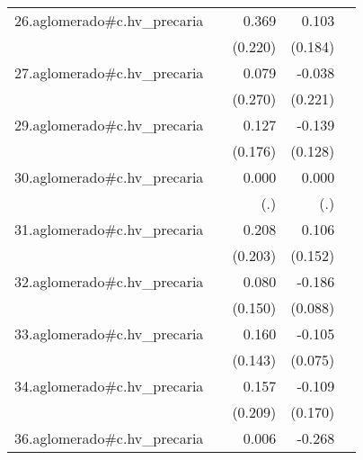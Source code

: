 {\begin{longtable}{l*{4}{D{.}{.}{-1}}}
\addlinespace
26.aglomerado#c.hv\_precaria&                     &       0.369         &       0.103         &                     \\
            &                     &     (0.220)         &     (0.184)         &                     \\
\addlinespace
27.aglomerado#c.hv\_precaria&                     &       0.079         &      -0.038         &                     \\
            &                     &     (0.270)         &     (0.221)         &                     \\
\addlinespace
29.aglomerado#c.hv\_precaria&                     &       0.127         &      -0.139         &                     \\
            &                     &     (0.176)         &     (0.128)         &                     \\
\addlinespace
30.aglomerado#c.hv\_precaria&                     &       0.000         &       0.000         &                     \\
            &                     &         (.)         &         (.)         &                     \\
\addlinespace
31.aglomerado#c.hv\_precaria&                     &       0.208         &       0.106         &                     \\
            &                     &     (0.203)         &     (0.152)         &                     \\
\addlinespace
32.aglomerado#c.hv\_precaria&                     &       0.080         &      -0.186\sym{*}  &                     \\
            &                     &     (0.150)         &     (0.088)         &                     \\
\addlinespace
33.aglomerado#c.hv\_precaria&                     &       0.160         &      -0.105         &                     \\
            &                     &     (0.143)         &     (0.075)         &                     \\
\addlinespace
34.aglomerado#c.hv\_precaria&                     &       0.157         &      -0.109         &                     \\
            &                     &     (0.209)         &     (0.170)         &                     \\
\addlinespace
36.aglomerado#c.hv\_precaria&                     &       0.006         &      -0.268         &                     \\

\end{longtable}}
